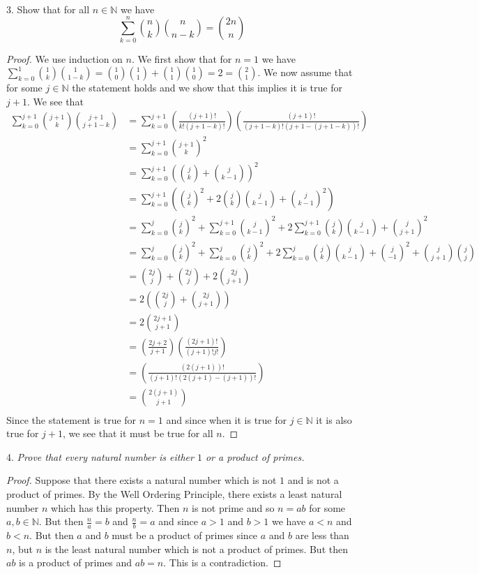 ~\documentclass{article}
\begin{document}
\begin{flushleft}
3. Show that for all $n \in \mathbb{N}$ we have
\[
\sum_{k=0}^{n} \binom{n}{k} \binom{n}{n-k} = \binom{2n}{n}
\]
\begin{proof}
We use induction on $n$. We first show that for $n=1$ we have $\sum_{k=0}^1 \binom{1}{k} \binom{1}{1-k} = \binom{1}{0} \binom{1}{1} + \binom{1}{1} \binom{1}{0} = 2 = \binom{2}{1}$. We now assume that for some $j \in \mathbb{N}$ the statement holds and we show that this implies it is true for $j+1$. We see that
\begin{align*}
\sum_{k=0}^{j+1} \binom{j+1}{k} \binom{j+1}{j+1-k} &= \sum_{k=0}^{j+1} \left( \frac{(j+1)!}{k! (j+1-k)!} \right) \left( \frac{(j+1)!}{(j+1-k)! (j+1 - (j+1-k))!} \right) \\
&= \sum_{k=0}^{j+1} \binom{j+1}{k}^2 \\
&= \sum_{k=0}^{j+1} \left( \binom{j}{k} + \binom{j}{k-1} \right)^2\\
&= \sum_{k=0}^{j+1} \left( \binom{j}{k}^2 + 2\binom{j}{k} \binom{j}{k-1} + \binom{j}{k-1}^2 \right) \\
&= \sum_{k=0}^{j} \binom{j}{k}^2 + \sum_{k=0}^{j+1} \binom{j}{k-1}^2 + 2\sum_{k=0}^{j+1} \binom{j}{k} \binom{j}{k-1} + \binom{j}{j+1}^2 \\
&= \sum_{k=0}^{j} \binom{j}{k}^2 + \sum_{k=0}^{j} \binom{j}{k}^2 + 2\sum_{k=0}^{j}\binom{j}{k} \binom{j}{k-1} + \binom{j}{-1}^2 + \binom{j}{j+1} \binom{j}{j} \\
&= \binom{2j}{j} + \binom{2j}{j} + 2\binom{2j}{j+1} \\
&= 2 \left( \binom{2j}{j} + \binom{2j}{j+1} \right) \\
&= 2 \binom{2j+1}{j+1} \\
&= \left( \frac{2j+2}{j+1} \right) \left( \frac{(2j+1)!}{(j+1)!j!} \right) \\
&= \left( \frac{(2(j+1))!}{(j+1)! (2(j+1)-(j+1))!} \right) \\
&= \binom{2(j+1)}{j+1} \\
\end{align*}
Since the statement is true for $n=1$ and since when it is true for $j \in \mathbb{N}$ it is also true for $j+1$, we see that it must be true for all $n$.
\end{proof}

4. \textsl{Prove that every natural number is either $1$ or a product of primes.}
\begin{proof}
Suppose that there exists a natural number which is not $1$ and is not a product of primes. By the Well Ordering Principle, there exists a least natural number $n$ which has this property. Then $n$ is not prime and so $n = ab$ for some $a,b \in \mathbb{N}$. But then $\frac{n}{a} = b$ and $\frac{n}{b} = a$ and since $a > 1$ and $b > 1$ we have $a<n$ and $b<n$. But then $a$ and $b$ must be a product of primes since $a$ and $b$ are less than $n$, but $n$ is the least natural number which is not a product of primes. But then $ab$ is a product of primes and $ab=n$. This is a contradiction.
\end{proof}


\end{flushleft}
\end{document}
